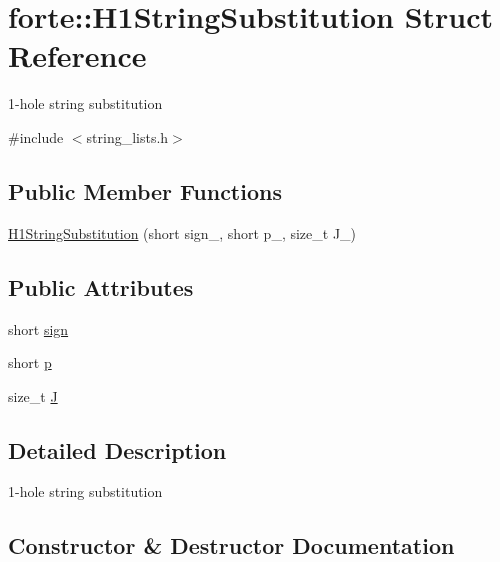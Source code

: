 \hypertarget{structforte_1_1_h1_string_substitution}{}\section{forte\+:\+:H1\+String\+Substitution Struct Reference}
\label{structforte_1_1_h1_string_substitution}


1-\/hole string substitution  




{\ttfamily \#include $<$string\+\_\+lists.\+h$>$}

\subsection*{Public Member Functions}
\begin{DoxyCompactItemize}
\item 
\mbox{\hyperlink{structforte_1_1_h1_string_substitution_a230549defd8fe0b1f5d484c6e55ad20c}{H1\+String\+Substitution}} (short sign\+\_\+, short p\+\_\+, size\+\_\+t J\+\_\+)
\end{DoxyCompactItemize}
\subsection*{Public Attributes}
\begin{DoxyCompactItemize}
\item 
short \mbox{\hyperlink{structforte_1_1_h1_string_substitution_a43540cf54f02952c917f5fae81091669}{sign}}
\item 
short \mbox{\hyperlink{structforte_1_1_h1_string_substitution_a57ff2013b86b6bed09fb329560524158}{p}}
\item 
size\+\_\+t \mbox{\hyperlink{structforte_1_1_h1_string_substitution_abe1e00c7e4d6473e06cc1b6559cace60}{J}}
\end{DoxyCompactItemize}


\subsection{Detailed Description}
1-\/hole string substitution 

\subsection{Constructor \& Destructor Documentation}
\mbox{\label{structforte_1_1_h1_string_substitution_a230549defd8fe0b1f5d484c6e55ad20c}} 
